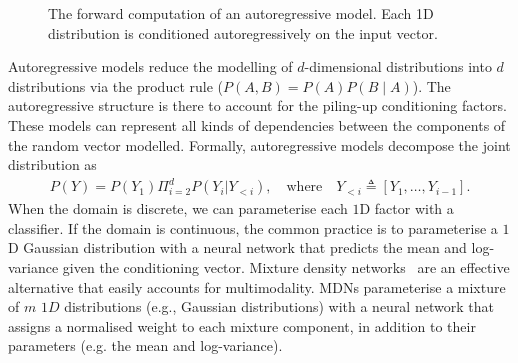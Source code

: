 \begin{figure}
\caption{The forward computation of an autoregressive model. Each 1D distribution is conditioned autoregressively on the input vector.}
\end{figure}
Autoregressive models reduce the modelling of $d$-dimensional distributions into $d$ distributions via the product rule ($P(A, B) = P(A) P(B\mid A)$). The autoregressive structure is there to account for the piling-up conditioning factors. These models can represent all kinds of dependencies between the components of the random vector modelled.
Formally, autoregressive models decompose the joint distribution as
\begin{align}
  P(Y) = P(Y_1) \Pi^d_{i=2} P(Y_i|Y_{<i}), \quad \text{where} \quad Y_{<i} \triangleq \left[ Y_1, \dots, Y_{i-1}\right].
\end{align}
When the domain is discrete, we can parameterise each $1$D factor with a classifier. If the domain is continuous, the common practice is to parameterise a $1$D Gaussian distribution with a neural network that predicts the mean and log-variance given the conditioning vector. Mixture density networks~\citep[][MDNs]{bishop1994mixture} are an effective alternative that easily accounts for multimodality. MDNs parameterise a mixture of $m$ $1D$ distributions (e.g., Gaussian distributions) with a neural network that assigns a normalised weight to each mixture component, in addition to their parameters (e.g. the mean and log-variance).
